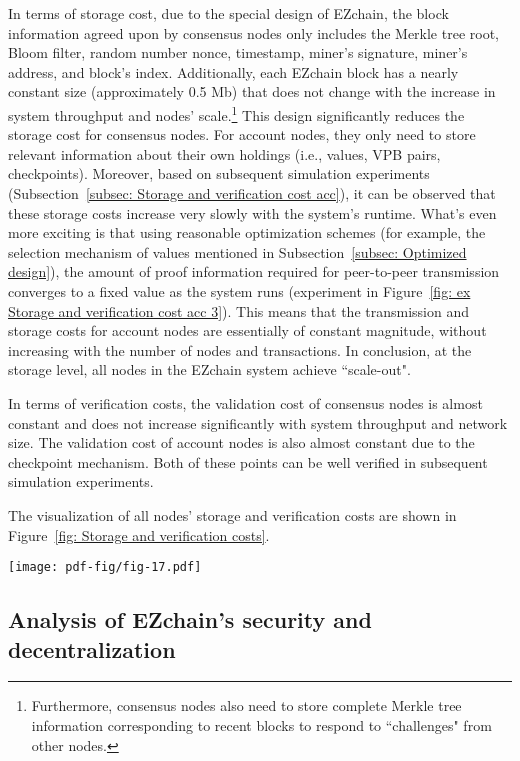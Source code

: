 \documentclass[conference]{IEEEtran}
\begin{document}
In terms of storage cost, due to the special design of EZchain, the block information agreed upon by consensus nodes only includes the Merkle tree root, Bloom filter, random number nonce, timestamp, miner's signature, miner's address, and block's index. Additionally, each EZchain block has a nearly constant size (approximately 0.5 Mb) that does not change with the increase in system throughput and nodes' scale.\footnote{Furthermore, consensus nodes also need to store complete Merkle tree information corresponding to recent blocks to respond to ``challenges" from other nodes.} This design significantly reduces the storage cost for consensus nodes. For account nodes, they only need to store relevant information about their own holdings (i.e., values, VPB pairs, checkpoints). Moreover, based on subsequent simulation experiments (Subsection~\ref{subsec: Storage and verification cost acc}), it can be observed that these storage costs increase very slowly with the system's runtime. What's even more exciting is that using reasonable optimization schemes (for example, the selection mechanism of values mentioned in Subsection~\ref{subsec: Optimized design}), the amount of proof information required for peer-to-peer transmission converges to a fixed value as the system runs (experiment in Figure~\ref{fig: ex Storage and verification cost acc 3}). This means that the transmission and storage costs for account nodes are essentially of constant magnitude, without increasing with the number of nodes and transactions. In conclusion, at the storage level, all nodes in the EZchain system achieve ``scale-out".

In terms of verification costs, the validation cost of consensus nodes is almost constant and does not increase significantly with system throughput and network size. The validation cost of account nodes is also almost constant due to the checkpoint mechanism. Both of these points can be well verified in subsequent simulation experiments.

The visualization of all nodes' storage and verification costs are shown in Figure~\ref{fig: Storage and verification costs}.

\begin{figure*}[h!]
    \centering
    \texttt{[image: pdf-fig/fig-17.pdf]}
    \caption{Storage and verification costs of each node in EZchain.}
    \label{fig: Storage and verification costs}
\end{figure*}

\subsection{Analysis of EZchain's security and decentralization}
\label{subsec: EZchain's security and decentralization analysis}
\end{document}
